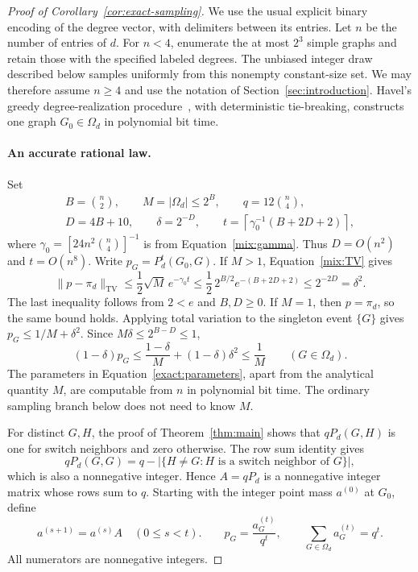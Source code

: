 \begin{proof}[Proof of Corollary~\ref{cor:exact-sampling}]
We use the usual explicit binary encoding of the degree vector, with
delimiters between its entries. Let $n$ be the number of entries of
$d$. For $n<4$,
enumerate the at most $2^3$ simple graphs and retain those with the
specified labeled degrees. The unbiased integer draw described below
samples uniformly from this nonempty constant-size set. We may
therefore assume $n\ge4$ and use the notation of
Section~\ref{sec:introduction}. Havel's greedy degree-realization
procedure~\cite{Havel55}, with deterministic tie-breaking, constructs
one graph $G_0\in\Omega_d$ in polynomial bit time.

\paragraph{An accurate rational law.}
Set
\begin{equation}\label{exact:parameters}
\begin{gathered}
 B=\binom n2,\qquad M=|\Omega_d|\le2^B,\qquad
 q=12\binom n4,\\
 D=4B+10,\qquad \delta=2^{-D},\qquad
 t=\left\lceil\gamma_0^{-1}(B+2D+2)\right\rceil,
\end{gathered}
\end{equation}
where $\gamma_0=[24n^2\binom n4]^{-1}$ is from
Equation~\eqref{mix:gamma}. Thus $D=O(n^2)$ and $t=O(n^8)$.
Write $p_G=P_d^t(G_0,G)$. If $M>1$, Equation~\eqref{mix:TV} gives
\[
 \|p-\pi_d\|_{\mathrm{TV}}
 \le\frac12\sqrt M\,e^{-\gamma_0t}
 \le\frac12\,2^{B/2}e^{-(B+2D+2)}
 \le2^{-2D}=\delta^2.
\]
The last inequality follows from $2<e$ and $B,D\ge0$.
If $M=1$, then $p=\pi_d$, so the same bound holds.
Applying total variation to the singleton event $\{G\}$ gives
$p_G\le1/M+\delta^2$. Since $M\delta\le2^{B-D}\le1$,
\begin{equation}\label{exact:domination}
 (1-\delta)p_G
 \le\frac{1-\delta}{M}+(1-\delta)\delta^2
 \le\frac1M
 \qquad(G\in\Omega_d).
\end{equation}
The parameters in Equation~\eqref{exact:parameters}, apart from the
analytical quantity $M$, are computable from $n$ in polynomial bit
time. The ordinary sampling branch below does not need to know $M$.

For distinct $G,H$, the proof of Theorem~\ref{thm:main} shows that
$qP_d(G,H)$ is one for switch neighbors and zero otherwise. The row
sum identity gives
\[
 qP_d(G,G)=q-\bigl|\{H\ne G:H\text{ is a switch neighbor of }G\}\bigr|,
\]
which is also a nonnegative integer. Hence $A=qP_d$ is a
nonnegative integer matrix whose rows sum to $q$. Starting with the
integer point mass $a^{(0)}$ at $G_0$, define
\begin{equation}\label{exact:law}
 a^{(s+1)}=a^{(s)}A\quad(0\le s<t).
 \qquad
 p_G=\frac{a_G^{(t)}}{q^t},
 \qquad
 \sum_{G\in\Omega_d}a_G^{(t)}=q^t.
\end{equation}
All numerators are nonnegative integers.


\end{proof}
